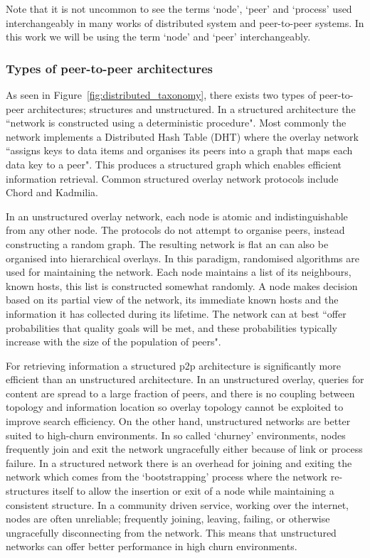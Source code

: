 Note that it is not uncommon to see the terms `node', `peer' and `process' used interchangeably in many works of distributed system and peer-to-peer systems. In this work we will be using the term `node' and `peer' interchangeably.

\subsubsection{Types of peer-to-peer architectures}

As seen in Figure~\ref{fig:distributed_taxonomy}, there exists two types of peer-to-peer architectures; structures and unstructured. In a structured architecture the ``network is constructed using a deterministic procedure"\cite{tanenbaum2007distributed}. Most commonly the network implements a Distributed Hash Table (DHT) where the overlay network ``assigns keys to data items and organises its peers into a graph that maps each data key to a peer"\cite{lua2005survey}. This produces a structured graph which enables efficient information retrieval. Common structured overlay network protocols include Chord\cite{stoica2003chord} and Kadmilia\cite{maymounkov2002kadmilia}.

In an unstructured overlay network, each node is atomic and indistinguishable from any other node\cite{kalogeraki2003localSearch}. The protocols do not attempt to organise peers, instead constructing a random graph. The resulting network is flat an can also be organised into hierarchical overlays. In this paradigm, randomised algorithms are used for maintaining the network. Each node maintains a list of its neighbours, known hosts, this list is constructed somewhat randomly\cite{tanenbaum2007distributed}. A node makes decision based on its partial view of the network, its immediate known hosts and the information it has collected during its lifetime. The network can at best ``offer probabilities that quality goals will be met, and these probabilities typically increase with the size of the population of peers"\cite{bass2003architecture}.

For retrieving information a structured p2p architecture is significantly more efficient than an unstructured architecture\cite{lua2005survey}. In an unstructured overlay, queries for content are spread to a large fraction of peers, and there is no coupling between topology and information location so overlay topology cannot be exploited to improve search efficiency. On the other hand, unstructured networks are better suited to high-churn environments. In so called `churney' environments, nodes frequently join and exit the network ungracefully either because of link or process failure. In a structured network there is an overhead for joining and exiting the network which comes from the `bootstrapping' process where the network re-structures itself to allow the insertion or exit of a node while maintaining a consistent structure. In a community driven service, working over the internet, nodes are often unreliable; frequently joining, leaving, failing, or otherwise ungracefully disconnecting from the network\cite{ripeanu2001peer}. This means that unstructured networks can offer better performance in high churn environments\cite{lua2005survey}.


